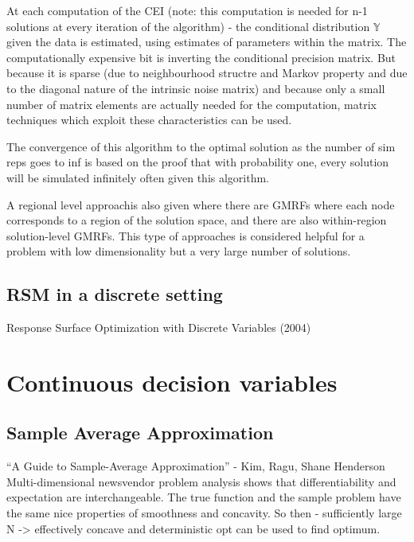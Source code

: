 \documentclass{article}
\begin{document}
At each computation of the CEI (note: this computation is needed for n-1 solutions at every iteration of the algorithm) - the conditional distribution $\mathbb{Y}$ given the data is estimated, using estimates of parameters within the matrix. The computationally expensive bit is inverting the conditional precision matrix. But because it is sparse (due to neighbourhood structre and Markov property and due to the diagonal nature of the intrinsic noise matrix) and because only a small number of matrix elements are actually needed for the computation, matrix techniques which exploit these characteristics can be used. \newline

The convergence of this algorithm to the optimal solution as the number of sim reps goes to inf is based on the proof that with probability one, every solution will be simulated infinitely often given this algorithm.  \newline

A regional level approachis also given where there are GMRFs where each node corresponds to a region of the solution space, and there are also within-region solution-level GMRFs. This type of approaches is considered helpful for a problem with low dimensionality but a very large number of solutions. \newline


\subsection{RSM in a discrete setting}

Response Surface Optimization with Discrete Variables (2004)

\section{Continuous decision variables}

\subsection{Sample Average Approximation}

``A Guide to Sample-Average Approximation'' - Kim, Ragu, Shane Henderson
Multi-dimensional newsvendor problem analysis shows that differentiability and expectation are interchangeable. The true function and the sample problem have the same nice properties of smoothness and concavity. So then - sufficiently large N -> effectively concave and deterministic opt can be used to find optimum.
\end{document}
